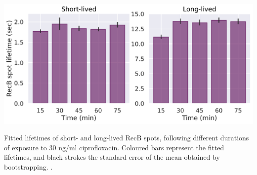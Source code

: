 \begin{suppfigure*}[htbp]
    \begin{center}
    \includegraphics[width=.7\linewidth]{SI_Figures/RecB_lifetime_timepoints.pdf}
    \end{center}
    \caption{Fitted lifetimes of short- and long-lived RecB spots, following different durations of exposure to 30 ng/ml ciprofloxacin. Coloured bars represent the fitted lifetimes, and black strokes the standard error of the mean obtained by bootstrapping. . }
    \label{SIFig:RecB_lifetimes_timepoints}
    \end{suppfigure*}


